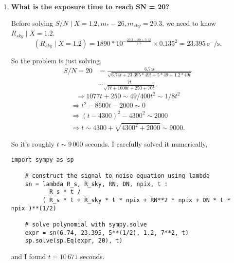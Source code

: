\documentclass[12pt,letterpaper]{article}
\begin{document}
\begin{enumerate}
    \item {\bf What is the exposure time to reach SN = 20?}

    Before solving $ S/N \mid X=1.2, m_{*}-26, m_{sky}=20.3 $, 
    we need to know $ R_{sky} \mid X=1.2 $.
    \begin{equation}
        (R_{sky} \mid X=1.2) = 1890 * 10^{ - \frac{20.3 - 20 + 0.12}{2.5} }
            \times 0.135^2
            = 23.395 \, \mathrm{e^- / s}.
    \end{equation}

    So the problem is just solving,
    \begin{equation}
        \begin{split}
            S/N = 20 
                &= \frac{ 6.74 t }{ \sqrt{ 6.74t + 23.395*49t + 5*49 + 1.2*49t } }\\
                &\sim \frac{7t}{\sqrt{7t + 1000t + 250 + 70t}}.
        \end{split}
    \end{equation}
    \begin{equation*}
        \Rightarrow 1077t + 250 \sim 49 / 400 t^2 \sim 1/8 t^2
    \end{equation*}
    \begin{equation*}
        \begin{split}
            \Rightarrow t^2 - 8600t - 2000 \sim 0\\
            \Rightarrow (t - 4300)^2 - 4300^2 \sim 2000\\
            \Rightarrow t \sim 4300 + \sqrt{ 4300^2 + 2000 } \sim 9000.
        \end{split}
    \end{equation*}

    So it's roughly $t \sim 9\,000$ seconds.  
    I carefully solved it numerically, 

    \begin{lstlisting}[style = python]
    import sympy as sp

    # construct the signal to noise equation using lambda
    sn = lambda R_s, R_sky, RN, DN, npix, t : 
           R_s * t /
         ( R_s * t + R_sky * t * npix + RN**2 * npix + DN * t * npix )**(1/2)    
        
    # solve polynomial with sympy.solve
    expr = sn(6.74, 23.395, 5**(1/2), 1.2, 7**2, t)
    sp.solve(sp.Eq(expr, 20), t)
    \end{lstlisting} 

    and I found $t = 10\,671$ seconds.


\end{enumerate}
\end{document}
